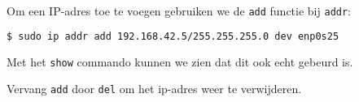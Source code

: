 Om een IP-adres toe te voegen gebruiken we de \texttt{add} functie bij \texttt{addr}:
\begin{lstlisting}[language=bash]
$ sudo ip addr add 192.168.42.5/255.255.255.0 dev enp0s25
\end{lstlisting}
Met het \texttt{show} commando kunnen we zien dat dit ook echt gebeurd is.

Vervang \texttt{add} door \texttt{del} om het ip-adres weer te verwijderen.
